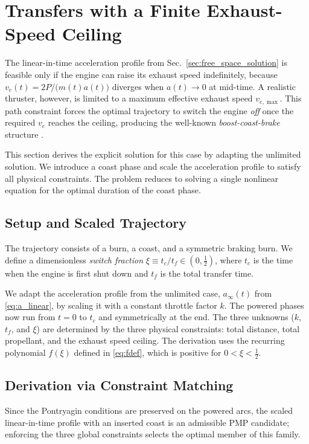 \documentclass[journal, a4paper]{IEEEtran}
\begin{document}
\section{Transfers with a Finite Exhaust-Speed Ceiling}
\label{sec:capped_ve}
The linear-in-time acceleration profile from Sec.~\ref{sec:free_space_solution} is feasible only if the engine can raise its exhaust speed indefinitely, because $v_e(t)=2P/\!\bigl(m(t)a(t)\bigr)$ diverges when $a(t)\!\to\!0$ at mid-time. A realistic thruster, however, is limited to a maximum effective exhaust speed $v_{e,\max}$. This path constraint forces the optimal trajectory to switch the engine \emph{off} once the required $v_e$ reaches the ceiling, producing the well-known \emph{boost-coast-brake} structure \cite{Fogel2020, pontani2021optimal}. 

This section derives the explicit solution for this case by adapting the unlimited solution. We introduce a coast phase and scale the acceleration profile to satisfy all physical constraints. The problem reduces to solving a single nonlinear equation for the optimal duration of the coast phase.

\subsection{Setup and Scaled Trajectory}
The trajectory consists of a burn, a coast, and a symmetric braking burn. We define a dimensionless \emph{switch fraction} $\xi\equiv t_c/t_f\in(0,\tfrac12)$, where $t_c$ is the time when the engine is first shut down and $t_f$ is the total transfer time.

We adapt the acceleration profile from the unlimited case, $a_\infty(t)$ from \eqref{eq:a_linear}, by scaling it with a constant throttle factor $k$. The powered phases now run from $t=0$ to $t_c$ and symmetrically at the end. The three unknowns ($k$, $t_f$, and $\xi$) are determined by the three physical constraints: total distance, total propellant, and the exhaust speed ceiling. The derivation uses the recurring polynomial $f(\xi)$  defined in \eqref{eq:fdef}, which is positive for $0<\xi<\tfrac12$.

\subsection{Derivation via Constraint Matching}
Since the Pontryagin conditions are preserved on the powered arcs, the scaled linear-in-time profile with an inserted coast is an admissible PMP candidate; enforcing the three global constraints selects the optimal member of this family.
\end{document}
